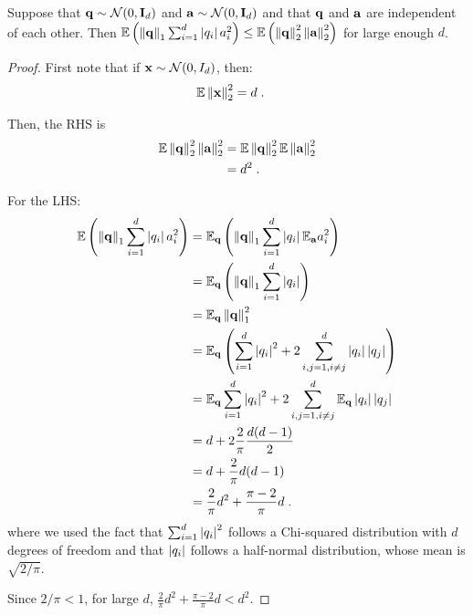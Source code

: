 \begin{lem}\label{lem:l1-var}
Suppose that $\mathbf{q} \sim \mathcal{N}(0, \mathbf{I}_d)$ and $\mathbf{a} \sim \mathcal{N}(0, \mathbf{I}_d)$ and that $\mathbf{q}$ and $\mathbf{a}$ are independent of each other. Then $\mathbb{E} \left( \left\Vert \mathbf{q} \right\Vert_1 \sum_{i=1}^d \left\vert q_i \right\vert a_i^2 \right) \leq \mathbb{E} \left( \left\Vert \mathbf{q} \right\Vert_2^2 \left\Vert \mathbf{a} \right\Vert_2^2 \right)$ for large enough $d$.
\label{lem:lem_var_gaussian}
\end{lem}

\begin{proof}

First note that if $\mathbf{x} \sim \mathcal{N}(0, I_d)$, then:
\begin{align*} 
\mathbb{E} \left\Vert \mathbf{x} \right\Vert_2^2 &= d \;.
\end{align*}

Then, the RHS is
\begin{align*}
\mathbb{E} \left\Vert \mathbf{q} \right\Vert_2^2 \left\Vert \mathbf{a} \right\Vert_2^2  &= \mathbb{E} \left\Vert \mathbf{q} \right\Vert_2^2 \mathbb{E} \left\Vert \mathbf{a} \right\Vert_2^2 \\
&= d^2 \;.
\end{align*}

For the LHS:
\begin{align*}
\mathbb{E} \left( \left\Vert \mathbf{q} \right\Vert_1 \sum_{i=1}^d \left\vert q_i \right\vert a_i^2 \right) &= \mathbb{E}_{\mathbf{q}} \left( \left\Vert \mathbf{q} \right\Vert_1 \sum_{i=1}^d \left\vert q_i \right\vert \mathbb{E}_{\mathbf{a}} a_i^2 \right) \\
&= \mathbb{E}_{\mathbf{q}} \left( \left\Vert \mathbf{q} \right\Vert_1 \sum_{i=1}^d \left\vert q_i \right\vert \right) \\
&= \mathbb{E}_{\mathbf{q}}  \left\Vert \mathbf{q} \right\Vert_1^2 \\
&= \mathbb{E}_{\mathbf{q}} \left( \sum_{i=1}^d \left\vert q_i \right\vert^2 + 2 \sum_{i,j=1, i \neq j}^d \left\vert q_i \right\vert \left\vert q_j \right\vert \right) \\
&= \mathbb{E}_{\mathbf{q}} \sum_{i=1}^d  \left\vert q_i \right\vert^2 + 2 \sum_{i,j=1, i \neq j}^d \mathbb{E}_{\mathbf{q}} \left\vert q_i \right\vert \left\vert q_j \right\vert \\
&= d + 2 \frac{2}{\pi} \frac{d(d-1)}{2} \\
&= d + \frac{2}{\pi} d(d-1) \\
&= \frac{2}{\pi} d^2 + \frac{\pi - 2}{\pi} d  \;.
\end{align*}
where we used the fact that $\sum_{i=1}^d  \left\vert q_i \right\vert^2$ follows a Chi-squared distribution with $d$ degrees of freedom and that $\left\vert q_i \right\vert$ follows a half-normal distribution, whose mean is $\sqrt{2/\pi}$.

Since $2/\pi < 1$, for large $d$, $ \frac{2}{\pi} d^2 + \frac{\pi - 2}{\pi} d  < d^2$.
\end{proof}


